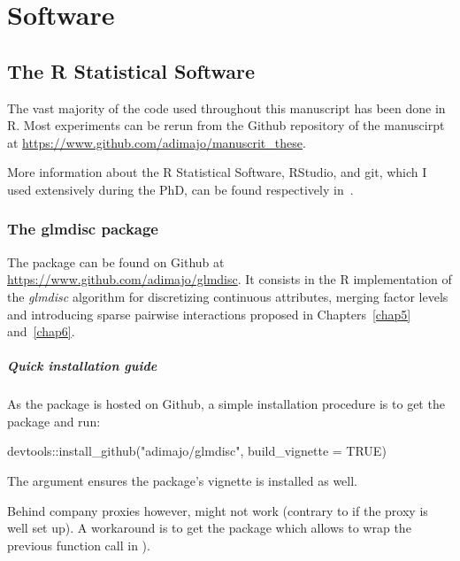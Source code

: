 \chapter{Software} \label{app2}

\section{The R Statistical Software}

The vast majority of the code used throughout this manuscript has been done in \textsf{R}. Most experiments can be rerun from the Github repository of the manuscirpt at \url{https://www.github.com/adimajo/manuscrit_these}.

More information about the \textsf{R} Statistical Software, RStudio, and git, which I used extensively during the PhD, can be found respectively in~\cite{prog_r_avance,gillespie_lovelace_2016,git_course}.

\subsection{The glmdisc package} \label{app2:glmdisc}

The  package can be found on Github at \url{https://www.github.com/adimajo/glmdisc}. It consists in the \textsf{R} implementation of the \textit{glmdisc} algorithm for discretizing continuous attributes, merging factor levels and introducing sparse pairwise interactions proposed in Chapters~\ref{chap5} and~\ref{chap6}.

\paragraph{Quick installation guide}

As the package is hosted on Github, a simple installation procedure is to get the  package and run:

\begin{rlisting}
devtools::install_github("adimajo/glmdisc", build_vignette = TRUE)
\end{rlisting}

The  argument ensures the package's vignette is installed as well.

Behind company proxies however,  might not work (contrary to  if the proxy is well set up). A workaround is to get the  package which allows to wrap the previous function call in ).


